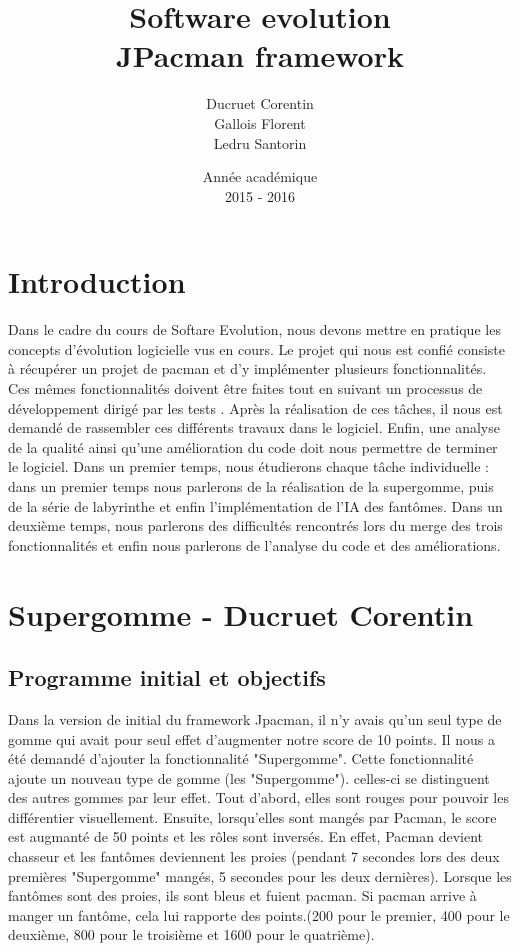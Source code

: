 \documentclass[a4paper,12pt]{report} %
\title{Software evolution \\ JPacman framework}
\author{Ducruet Corentin \\ Gallois Florent \\ Ledru Santorin}
\date{Année académique\\2015 - 2016}
\begin{document}
 
\maketitle
\newpage 
{} %
\tableofcontents
\newpage
\section{Introduction}
Dans le cadre du cours de Softare Evolution, nous devons mettre en pratique les concepts d'évolution logicielle vus en cours. Le projet qui nous est confié consiste à récupérer un projet de pacman et d'y implémenter plusieurs fonctionnalités. Ces mêmes fonctionnalités doivent être faites tout en suivant un processus de développement dirigé par les tests . Après la réalisation de ces tâches, il nous est demandé de rassembler ces différents travaux dans le logiciel. Enfin, une analyse de la qualité ainsi qu'une amélioration du code doit nous permettre de terminer le logiciel.
Dans un premier temps, nous étudierons chaque tâche individuelle : dans un premier temps nous parlerons de la réalisation de la supergomme, puis de la série de labyrinthe et enfin l'implémentation de l'IA des fantômes.
Dans un deuxième temps, nous parlerons des difficultés rencontrés lors du merge des trois fonctionnalités et enfin nous parlerons de l'analyse du code et des améliorations.

\section{Supergomme - Ducruet Corentin}
\subsection{Programme initial et objectifs}
Dans la version de initial du framework Jpacman, il n'y avais qu'un seul type de gomme qui avait pour seul effet d'augmenter notre score de 10 points. Il nous a été demandé d'ajouter la fonctionnalité "Supergomme". Cette fonctionnalité ajoute un nouveau type de gomme (les "Supergomme"). celles-ci se distinguent des autres gommes par leur effet. Tout d'abord, elles sont rouges pour pouvoir les différentier visuellement. Ensuite, lorsqu'elles sont mangés par Pacman, le score est augmanté de 50 points et les rôles sont inversés. En effet, Pacman devient chasseur et les fantômes deviennent les proies (pendant 7 secondes lors des deux premières "Supergomme" mangés, 5 secondes pour les deux dernières). Lorsque les fantômes sont des proies, ils sont bleus et fuient pacman. Si pacman arrive à manger un fantôme, cela lui rapporte des points.(200 pour le premier, 400 pour le deuxième, 800 pour le troisième et 1600 pour le quatrième).
\end{document}
